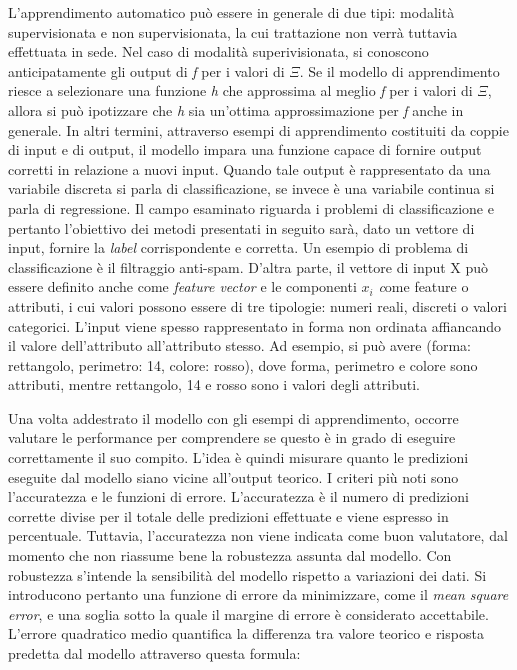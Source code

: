 \documentclass[11pt]{article}
\begin{document}
L'apprendimento automatico può essere in generale di due tipi: modalità supervisionata e non supervisionata, la cui trattazione non verrà tuttavia effettuata in sede. Nel caso di modalità superivisionata, si conoscono anticipatamente gli output di \textit {f} per i valori di $\Xi$. Se il modello di apprendimento riesce a selezionare una funzione \textit {h} che approssima al meglio \textit {f} per i valori di $\Xi$, allora si può ipotizzare che \textit {h} sia un'ottima approssimazione per \textit {f} anche in generale. In altri termini, attraverso esempi di apprendimento costituiti da coppie di input e di output, il modello impara una funzione capace di fornire output corretti in relazione a nuovi input. 
Quando tale output è rappresentato da una variabile discreta si parla di classificazione, se invece è una variabile continua si parla di regressione. Il campo esaminato riguarda i problemi di classificazione e pertanto l'obiettivo dei metodi presentati in seguito sarà, dato un  vettore di input, fornire la \textit {label} corrispondente e corretta. Un esempio di problema di classificazione è il filtraggio anti-spam. 
D'altra parte, il vettore di input X può essere definito anche come \textit {feature vector} e le componenti $x_i$ \textit come {feature} o attributi, i cui valori possono essere di tre tipologie: numeri reali, discreti o valori categorici. L'input viene spesso rappresentato in forma non ordinata affiancando il valore dell'attributo all'attributo stesso. Ad esempio, si può avere (forma: rettangolo, perimetro: 14, colore: rosso), dove forma, perimetro e colore sono attributi, mentre rettangolo, 14 e rosso sono i valori degli attributi. 

Una volta addestrato il modello con gli esempi di apprendimento, occorre valutare le performance per comprendere se questo è in grado di eseguire correttamente il suo compito. L'idea è quindi misurare quanto le predizioni eseguite dal modello siano vicine all'output teorico.  I criteri più noti sono l'accuratezza e le funzioni di errore. L'accuratezza è il numero di predizioni corrette divise per il totale delle predizioni effettuate e viene espresso in percentuale. Tuttavia, l'accuratezza non viene indicata come buon valutatore, dal momento che non riassume bene la robustezza assunta dal modello. Con robustezza s'intende la sensibilità del modello rispetto a variazioni dei dati. Si introducono pertanto una funzione di errore da minimizzare, come il \textit{mean square error},  e una soglia sotto la quale il margine di errore è considerato accettabile. L'errore quadratico medio quantifica la differenza tra valore teorico e risposta predetta dal modello attraverso questa formula: 
\end{document}
